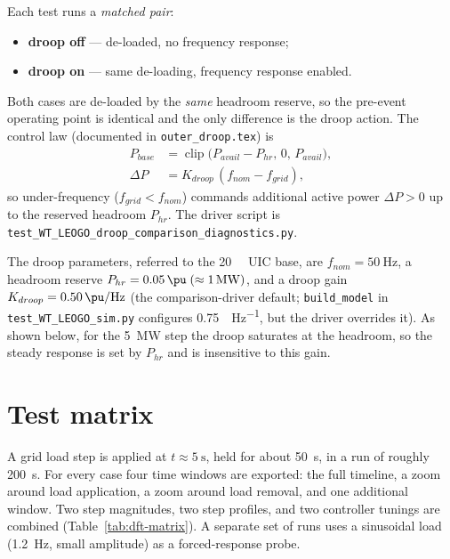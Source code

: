 \documentclass[11pt]{article}
\begin{document}
Each test runs a \emph{matched pair}:
\begin{itemize}
  \item \textbf{droop off} --- de-loaded, no frequency response;
  \item \textbf{droop on} --- same de-loading, frequency response enabled.
\end{itemize}
Both cases are de-loaded by the \emph{same} headroom reserve, so the pre-event
operating point is identical and the only difference is the droop action. The
control law (documented in \texttt{outer\_droop.tex}) is
\begin{align}
  P_{base} &= \operatorname{clip}\!\big(P_{avail}-P_{hr},\,0,\,P_{avail}\big),\\
  \Delta P &= K_{droop}\,(f_{nom}-f_{grid}),
\end{align}
so under-frequency (\(f_{grid}<f_{nom}\)) commands additional active power
\(\Delta P>0\) up to the reserved headroom \(P_{hr}\). The driver script is
\texttt{test\_WT\_LEOGO\_droop\_comparison\_diagnostics.py}.

The droop parameters, referred to the \SI{20}{\mega\voltampere} UIC base, are
\(f_{nom}=\SI{50}{\hertz}\), a headroom reserve
\(P_{hr}=\SI{0.05}{\pu}\;(\approx\SI{1}{\mega\watt})\), and a droop gain
\(K_{droop}=\SI{0.50}{\pu\per\hertz}\) (the comparison-driver default;
\texttt{build\_model} in \texttt{test\_WT\_LEOGO\_sim.py} configures
\SI{0.75}{\pu\per\hertz}, but the driver overrides it). As shown below, for the
\SI{5}{\mega\watt} step the droop saturates at the headroom, so the steady
response is set by \(P_{hr}\) and is insensitive to this gain.

\section{Test matrix}
\label{sec:dft-matrix}
A grid load step is applied at \(t\approx\SI{5}{\second}\), held for about
\SI{50}{\second}, in a run of roughly \SI{200}{\second}. For every case four time
windows are exported: the full timeline, a zoom around load application, a zoom
around load removal, and one additional window. Two step magnitudes, two step
profiles, and two controller tunings are combined (Table~\ref{tab:dft-matrix}).
A separate set of runs uses a sinusoidal load (\SI{1.2}{\hertz}, small
amplitude) as a forced-response probe.
\end{document}
